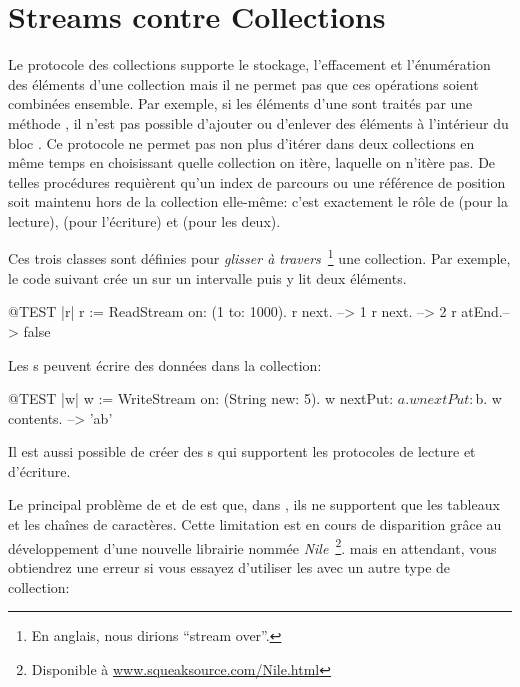 \documentclass[a4paper,10pt,twoside]{book}
\begin{document}
\section{Streams contre Collections}

Le protocole des collections supporte le stockage, l'effacement et l'énumération
des éléments d'une collection mais il ne permet pas que ces opérations
soient combinées ensemble. Par exemple, si les éléments d'une 
 sont traités par une méthode , il n'est pas possible d'ajouter ou d'enlever des éléments à l'intérieur du bloc .
Ce protocole ne permet pas non plus d'itérer dans deux collections
en même temps en choisissant quelle collection on itère, laquelle on n'itère pas.
De telles procédures requièrent qu'un index de parcours ou une référence
de position soit maintenu hors de la collection elle-même:
c'est exactement le rôle de  
 (pour la lecture),  (pour l'écriture) et  (pour les deux).

Ces trois classes sont définies pour \emph{glisser à travers}~\footnote{En anglais, nous dirions ``stream over''.} une collection.
Par exemple, le code suivant crée un \stream sur un intervalle puis y lit deux éléments.
\begin{code}{@TEST |r|}
r := ReadStream on: (1 to: 1000).
r next.   --> 1
r next.   --> 2
r atEnd.--> false
\end{code}

Les s peuvent écrire des données dans la collection:
\begin{code}{@TEST |w|}
w := WriteStream on: (String new: 5).
w nextPut: $a.
w nextPut: $b.
w contents. -->  'ab'
\end{code}

Il est aussi possible de créer des s qui supportent
les protocoles de lecture et d'écriture.

Le principal problème de  et de 
est que, dans \pharo, ils ne supportent que les tableaux et les 
chaînes de caractères. Cette limitation est en cours de
disparition grâce au développement d'une nouvelle librairie
nommée \emph{Nile}~\footnote{Disponible à \url{www.squeaksource.com/Nile.html}}. 
mais en attendant, vous obtiendrez une erreur
si vous essayez d'utiliser les \streams avec un autre type de collection:
\end{document}
